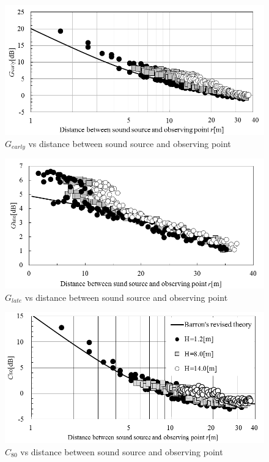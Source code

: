 \begin{figure}[H]
    \centering
    \includegraphics[keepaspectratio,scale=1]{04_att/Ge_Barron.png}
    \caption{\hspace{1mm}$G_{early}$ vs distance between sound source and observing point}
    \label{fig:Ge_Barron}
\end{figure}

\begin{figure}[H]
    \centering
    \includegraphics[keepaspectratio,scale=1]{04_att/Gl_Barron.png}
    \caption{\hspace{1mm}$G_{late}$ vs distance between sound source and observing point}
    \label{fig:Gl_Barron}
\end{figure}

\begin{figure}[H]
    \centering
    \includegraphics[keepaspectratio,scale=1]{04_att/C_Barron.png}
    \caption{\hspace{1mm}$C_{80}$ vs distance between sound source and observing point}
    \label{fig:C_Barron}
\end{figure}

